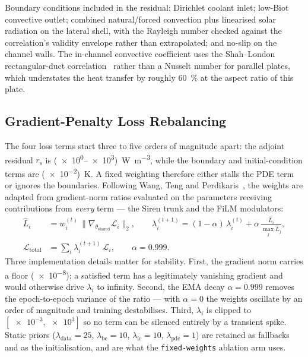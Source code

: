 \documentclass[journal,10pt,compsoc,onecolumn]{IEEEtran}
\begin{document}
\noindent
Boundary conditions included in the residual: Dirichlet coolant inlet;
low-Biot convective outlet; combined natural/forced convection plus linearised
solar radiation on the lateral shell, with the Rayleigh number checked against
the correlation's validity envelope rather than extrapolated; and no-slip on the
channel walls. The in-channel convective coefficient uses the Shah--London
rectangular-duct correlation~\cite{shah1978,hsu1969} rather than a Nusselt
number for parallel plates, which understates the heat transfer by roughly
\SI{60}{\percent} at the aspect ratio of this plate.

\subsection{Gradient-Penalty Loss Rebalancing}
\label{sec:details-gradpenalty}

\noindent
The four loss terms start three to five orders of magnitude apart: the
adjoint residual $r_s$ is (\num{e0}--\num{e3})~\si{\watt\per\metre\cubed},
while the boundary and initial-condition terms are (\num{e-2})~\si{\kelvin}.
A fixed weighting therefore either stalls the PDE term or ignores the
boundaries. Following Wang, Teng and Perdikaris~\cite{wang2021}, the weights are
adapted from gradient-norm ratios evaluated on the parameters receiving
contributions from \emph{every} term --- the Siren trunk and the FiLM
modulators:
\begin{align}
 \hat{L}_i &= w_i^{(t)}\,\bigl\lVert\nabla_{\theta_{\mathrm{shared}}}\mathcal{L}_i\bigr\rVert_2, \qquad
 \lambda_i^{(t+1)} = (1-\alpha)\,\lambda_i^{(t)} + \alpha\,
                    \frac{\hat{L}_i}{\max_j \hat{L}_j}, \\
 \mathcal{L}_{\mathrm{total}} &= \sum_i \lambda_i^{(t+1)}\,\mathcal{L}_i,
 \qquad \alpha = 0.999 .
\label{eq:gradpen}
\end{align}
Three implementation details matter for stability. First, the gradient norm
carries a floor (\num{e-8}); a satisfied term has a legitimately vanishing
gradient and would otherwise drive $\lambda_i$ to infinity. Second, the EMA
decay $\alpha=0.999$ removes the epoch-to-epoch variance of the ratio --- with
$\alpha=0$ the weights oscillate by an order of magnitude and training
destabilises. Third, $\lambda_i$ is clipped to $[\num{e-3},\num{e3}]$ so no term
can be silenced entirely by a transient spike. Static priors
($\lambda_{\mathrm{data}}=25$, $\lambda_{\mathrm{bc}}=10$,
$\lambda_{\mathrm{ic}}=10$, $\lambda_{\mathrm{pde}}=1$) are retained as
fallbacks and as the initialisation, and are what the
\texttt{fixed-weights} ablation arm uses.
\end{document}
